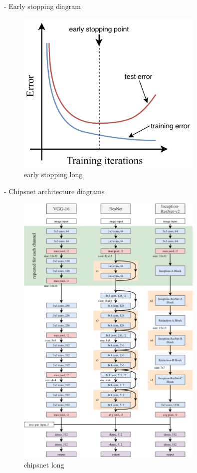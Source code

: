 - Early stopping diagram
\begin{figure}
    \includegraphics[width=0.8\textwidth]{diagrams/6-cvn/early_stopping.pdf}
    \caption[early stopping short]{early stopping long}
    \label{fig:early_stopping}
\end{figure}
- Chipsnet architecture diagrams
\begin{figure}
    \includegraphics[width=0.8\textwidth]{diagrams/6-cvn/chipsnet.pdf}
    \caption[chipsnet short]{chipsnet long}
    \label{fig:chipsnet}
\end{figure}
